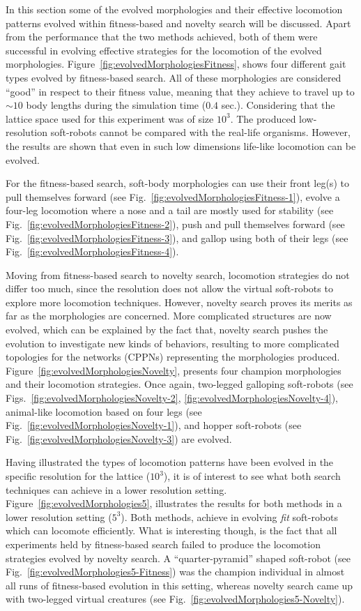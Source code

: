In this section some of the evolved morphologies and their effective locomotion patterns evolved within fitness-based and novelty search will be discussed. Apart from the performance that the two methods achieved, both of them were successful in evolving effective strategies for the locomotion of the evolved morphologies. Figure~\ref{fig:evolvedMorphologiesFitness}, shows four different gait types evolved by fitness-based search. All of these morphologies are considered ``good'' in respect to their fitness value, meaning that they achieve to travel up to $\sim 10$ body lengths during the simulation time ($0.4$ sec.). Considering that the lattice space used for this experiment was of size $10^3$. The produced low-resolution soft-robots cannot be compared with the real-life organisms. However, the results are shown that even in such low dimensions life-like locomotion can be evolved. 

For the fitness-based search, soft-body morphologies can use their front leg(s) to pull themselves forward (see Fig.~\ref{fig:evolvedMorphologiesFitness-1}), evolve a four-leg locomotion where a nose and a tail are mostly used for stability (see Fig.~\ref{fig:evolvedMorphologiesFitness-2}), push and pull themselves forward (see Fig.~\ref{fig:evolvedMorphologiesFitness-3}), and gallop using both of their legs (see Fig.~\ref{fig:evolvedMorphologiesFitness-4}). 

Moving from fitness-based search to novelty search, locomotion strategies do not differ too much, since the resolution does not allow the virtual soft-robots to explore more locomotion techniques. However, novelty search proves its merits as far as the morphologies are concerned. More complicated structures are now evolved, which can be explained by the fact that, novelty search pushes the evolution to investigate new kinds of behaviors, resulting to more complicated topologies for the networks (CPPNs) representing the morphologies produced. Figure~\ref{fig:evolvedMorphologiesNovelty}, presents four champion morphologies and their locomotion strategies. Once again, two-legged galloping soft-robots (see Figs.~\ref{fig:evolvedMorphologiesNovelty-2}, \ref{fig:evolvedMorphologiesNovelty-4}), animal-like locomotion based on four legs (see Fig.~\ref{fig:evolvedMorphologiesNovelty-1}), and hopper soft-robots (see Fig.~\ref{fig:evolvedMorphologiesNovelty-3}) are evolved.

Having illustrated the types of locomotion patterns have been evolved in the specific resolution for the lattice ($10^3$), it is of interest to see what both search techniques can achieve in a lower resolution setting. Figure~\ref{fig:evolvedMorphologies5}, illustrates the results for both methods in a lower resolution setting ($5^3$). Both methods, achieve in evolving \emph{fit} soft-robots which can locomote efficiently. What is interesting though, is the fact that all experiments held by fitness-based search failed to produce the locomotion strategies evolved by novelty search. A ``quarter-pyramid'' shaped soft-robot (see Fig.~\ref{fig:evolvedMorphologies5-Fitness}) was the champion individual in almost all runs of fitness-based evolution in this setting, whereas novelty search came up with two-legged virtual creatures (see Fig.~\ref{fig:evolvedMorphologies5-Novelty}).

